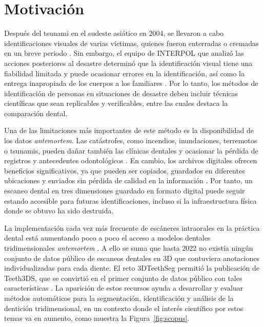 \section{Motivación}
\label{sec:motivacion}

Después del tsunami en el sudeste asiático en 2004, se llevaron a cabo identificaciones visuales de varias víctimas, quienes fueron enterradas o cremadas en un breve periodo 
\cite{forrestForensicOdontologyDVI2019}. Sin embargo, el equipo de INTERPOL que analizó las acciones posteriores al desastre determinó que la identificación visual tiene una fiabilidad
limitada y puede ocasionar errores en la identificación, así como la entrega inapropiada de los cuerpos a los familiares \cite{forrestForensicOdontologyDVI2019}. Por lo tanto, los métodos
de identificación de personas en situaciones de desastre deben incluir técnicas científicas que sean replicables y verificables, entre las cuales destaca la comparación dental.

Una de las limitaciones más importantes de este método es la disponibilidad de los datos \textit{antemortem}. Las catástrofes, como incendios, inundaciones, terremotos o tsunamis, pueden
dañar también las clínicas dentales y ocasionar la pérdida de registros y antecedentes odontológicos \cite{forrestForensicOdontologyDVI2019}. En cambio, los archivos digitales ofrecen
beneficios significativos, ya que pueden ser copiados, guardados en diferentes ubicaciones y enviados sin pérdida de calidad en la información \cite{forrestForensicOdontologyDVI2019}.
Por tanto, un escaneo dental en tres dimensiones guardado en formato digital puede seguir estando accesible para futuras identificaciones, incluso si la infraestructura física donde se 
obtuvo ha sido destruida.

La implementación cada vez más frecuente de escáneres intraorales en la práctica dental está aumentando poco a poco el acceso a modelos dentales tridimensionales \textit{antemortem}
\cite{leeClinicalApplicationIntraoral2024}. A ello se suma que hasta 2022 no existía ningún conjunto de datos público de escaneos dentales en 3D que contuviera anotaciones 
individualizadas para cada diente. El reto 3DTeethSeg permitió la publicación de Teeth3DS, que se convirtió en el primer conjunto de datos público con tales características 
\cite{ben-hamadou3DTeethSeg223DTeeth2023}. La aparición de estos recursos ayuda a desarrollar y evaluar métodos automáticos para la segmentación, identificación y análisis de la 
dentición tridimensional, en un contexto donde el interés científico por estos temas va en aumento, como muestra la Figura~\ref{fig:scopus}.

